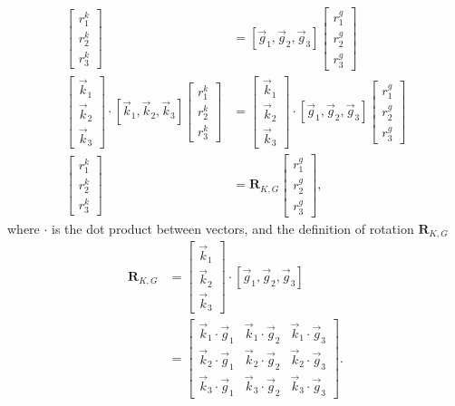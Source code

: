 \documentclass{article}
\newcommand{\mat}[1]{\mathbf{#1}}
\newcommand{\MR}{\mat{R}}
\begin{document}
\begin{align*}
    [\vec{k}_1, \vec{k}_2, \vec{k}_3]
    \begin{bmatrix}
      r^k_1 \\ r^k_2 \\ r^k_3
    \end{bmatrix}
    &=
    [\vec{g}_1, \vec{g}_2, \vec{g}_3]
    \begin{bmatrix} 
      r^g_1 \\ r^g_2 \\ r^g_3 
    \end{bmatrix}
    \\
    \begin{bmatrix}
      \vec{k}_1 \\ \vec{k}_2 \\ \vec{k}_3
    \end{bmatrix}
    \cdot
    [\vec{k}_1, \vec{k}_2, \vec{k}_3]
    \begin{bmatrix}
      r^k_1 \\ r^k_2 \\ r^k_3
    \end{bmatrix}
    &=
    \begin{bmatrix}
      \vec{k}_1 \\ \vec{k}_2 \\ \vec{k}_3
    \end{bmatrix}
    \cdot
    [\vec{g}_1, \vec{g}_2, \vec{g}_3]
    \begin{bmatrix}
      r^g_1 \\ r^g_2 \\ r^g_3
    \end{bmatrix}
    \\
    \begin{bmatrix}
      r^k_1 \\ r^k_2 \\ r^k_3
    \end{bmatrix}
    &= \mathbf{R}_{K,G}
    \begin{bmatrix}
      r^g_1 \\ r^g_2 \\ r^g_3
    \end{bmatrix},
\end{align*}
where $\cdot$ is the dot product between vectors, and the definition of rotation $\MR_{K,G}$
\begin{align}
    \MR_{K,G} 
    &=
    \begin{bmatrix}
      \vec{k}_1 \\ \vec{k}_2 \\ \vec{k}_3
    \end{bmatrix}
    \cdot
    [\vec{g}_1, \vec{g}_2, \vec{g}_3]\\
    &=
    \begin{bmatrix}
      \vec{k}_1 \cdot \vec{g}_1 & \vec{k}_1 \cdot \vec{g}_2 & \vec{k}_1 \cdot \vec{g}_3 \\
      \vec{k}_2 \cdot \vec{g}_1 & \vec{k}_2 \cdot \vec{g}_2 & \vec{k}_2 \cdot \vec{g}_3 \\
      \vec{k}_3 \cdot \vec{g}_1 & \vec{k}_3 \cdot \vec{g}_2 & \vec{k}_3 \cdot \vec{g}_3
    \end{bmatrix}.
    \label{eq:matrix_of_dotproduct}
\end{align}
\end{document}

